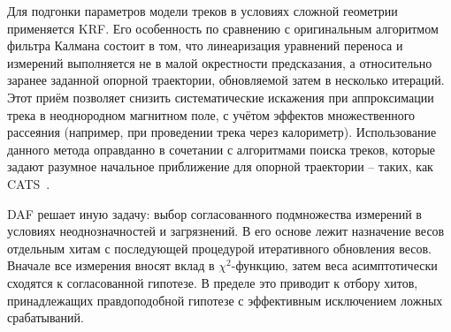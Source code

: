 Для подгонки параметров модели треков в условиях сложной геометрии
применяется KRF.
Его особенность по сравнению с оригинальным алгоритмом фильтра Калмана
состоит в том, что линеаризация уравнений переноса и измерений
выполняется не в малой окрестности предсказания, а
относительно заранее заданной опорной траектории,
обновляемой затем в несколько итераций. Этот приём позволяет снизить
систематические искажения при аппроксимации трека в
неоднородном магнитном поле, с учётом эффектов множественного
рассеяния (например, при проведении трека через калориметр).
Использование данного метода оправданно в сочетании с алгоритмами
поиска треков, которые задают разумное начальное приближение
для опорной траектории -- таких, как CATS~\cite{catsc-nim}.

DAF решает иную задачу: выбор согласованного подмножества
измерений в условиях неоднозначностей и загрязнений. В
его основе лежит назначение весов отдельным хитам с
последующей процедурой итеративного обновления весов. Вначале все
измерения вносят вклад в $\chi^2$-функцию, затем веса асимптотически
сходятся к согласованной гипотезе. В пределе это приводит к отбору
хитов, принадлежащих правдоподобной гипотезе с эффективным
исключением ложных срабатываний.
